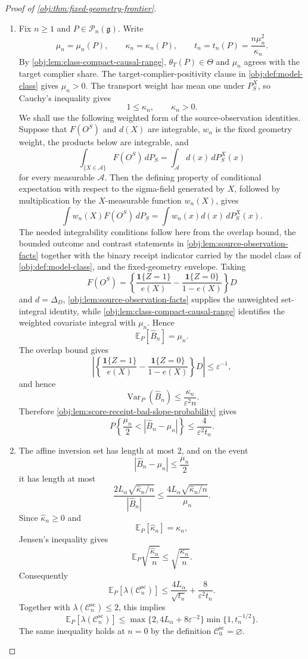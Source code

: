 \begin{proof}[Proof of \cref{obj:thm:fixed-geometry-frontier}]
\begin{enumerate}
\item Fix \(n\ge1\) and \(P\in\mathcal P_n(\mathfrak g)\).  Write
\[
\mu_n=\mu_n(P),\qquad
\kappa_n=\kappa_n(P),\qquad
t_n=t_n(P)=\frac{n\mu_n^2}{\kappa_n}.
\]
By \cref{obj:lem:class-compact-causal-range}, \(\theta_T(P)\in\Theta\) and \(\mu_n\) agrees with the target complier share.  The target-complier-positivity clause in \cref{obj:def:model-class} gives \(\mu_n>0\).  The transport weight has mean one under \(P_S^X\), so Cauchy's inequality gives
\[
1\le \kappa_n,
\qquad
\kappa_n>0.
\]
We shall use the following weighted form of the source-observation identities.  Suppose that \(F(O^S)\) and \(d(X)\) are integrable, \(w_n\) is the fixed geometry weight, the products below are integrable, and
\[
\int_{\{X\in \mathcal A\}}F(O^S)\,dP_S
=
\int_{\mathcal A}d(x)\,dP_S^X(x)
\]
for every measurable \(\mathcal A\).  Then the defining property of conditional expectation with respect to the sigma-field generated by \(X\), followed by multiplication by the \(X\)-measurable function \(w_n(X)\), gives
\[
\int w_n(X)F(O^S)\,dP_S
=
\int w_n(x)d(x)\,dP_S^X(x).
\]
The needed integrability conditions follow here from the overlap bound, the bounded outcome and contrast statements in \cref{obj:lem:source-observation-facts} together with the binary receipt indicator carried by the model class of \cref{obj:def:model-class}, and the fixed-geometry envelope.  Taking
\[
F(O^S)=
\left\{\frac{\mathbf 1\{Z=1\}}{e(X)}
-
\frac{\mathbf 1\{Z=0\}}{1-e(X)}
\right\}D
\]
and \(d=\Delta_D\), \cref{obj:lem:source-observation-facts} supplies the unweighted set-integral identity, while \cref{obj:lem:class-compact-causal-range} identifies the weighted covariate integral with \(\mu_n\).  Hence
\[
\mathbb E_P[\widehat B_n]=\mu_n .
\]
The overlap bound gives
\[
\left|
\left\{\frac{\mathbf 1\{Z=1\}}{e(X)}
-
\frac{\mathbf 1\{Z=0\}}{1-e(X)}
\right\}D
\right|
\le
\varepsilon^{-1},
\]
and hence
\[
\operatorname{Var}_P(\widehat B_n)
\le
\frac{\kappa_n}{\varepsilon^2 n}.
\]
Therefore \cref{obj:lem:score-receipt-bad-slope-probability} gives
\[
P\left\{\frac{\mu_n}{2}<|\widehat B_n-\mu_n|\right\}
\le
\frac{4}{\varepsilon^2 t_n}.
\]

\item The affine inversion set has length at most \(2\), and on the event
\[
|\widehat B_n-\mu_n|\le \frac{\mu_n}{2}
\]
it has length at most
\[
\frac{2L_\alpha\sqrt{\widehat\kappa_n/n}}{|\widehat B_n|}
\le
\frac{4L_\alpha\sqrt{\widehat\kappa_n/n}}{\mu_n}.
\]
Since \(\widehat\kappa_n\ge0\) and
\[
\mathbb E_P[\widehat\kappa_n]=\kappa_n,
\]
Jensen's inequality gives
\[
\mathbb E_P\sqrt{\frac{\widehat\kappa_n}{n}}
\le
\sqrt{\frac{\kappa_n}{n}}.
\]
Consequently
\[
\mathbb E_P[\lambda(\mathscr C_n^{\mathrm{sc}})]
\le
\frac{4L_\alpha}{\sqrt{t_n}}
+
\frac{8}{\varepsilon^2t_n}.
\]
Together with \(\lambda(\mathscr C_n^{\mathrm{sc}})\le2\), this implies
\[
\mathbb E_P[\lambda(\mathscr C_n^{\mathrm{sc}})]
\le
\max\{2,4L_\alpha+8\varepsilon^{-2}\}
\min\{1,t_n^{-1/2}\}.
\]
The same inequality holds at \(n=0\) by the definition \(\mathscr C_0^{\mathrm{sc}}=\varnothing\).


\end{enumerate}
\end{proof}
